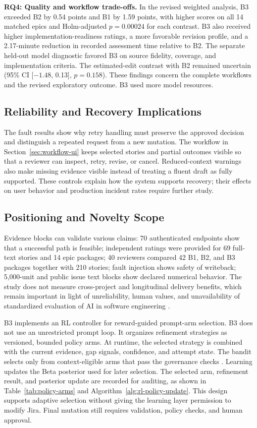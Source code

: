 \documentclass[pdflatex,sn-basic]{sn-jnl}
\begin{document}
\textbf{RQ4: Quality and workflow trade-offs.} In the revised weighted analysis, B3 exceeded B2 by 0.54 points and B1 by 1.59 points, with higher scores on all 14 matched epics and Holm-adjusted $p=0.00024$ for each contrast. B3 also received higher implementation-readiness ratings, a more favorable revision profile, and a 2.17-minute reduction in recorded assessment time relative to B2. The separate held-out model diagnostic favored B3 on source fidelity, coverage, and implementation criteria. The estimated-edit contrast with B2 remained uncertain (95\% CI [$-1.48$, 0.13], $p=0.158$). These findings concern the complete workflows and the revised exploratory outcome. B3 used more model resources.

\subsection{Reliability and Recovery Implications}
The fault results show why retry handling must preserve the approved decision and distinguish a repeated request from a new mutation. The workflow in Section~\ref{sec:workflow-ui} keeps selected stories and partial outcomes visible so that a reviewer can inspect, retry, revise, or cancel. Reduced-context warnings also make missing evidence visible instead of treating a fluent draft as fully supported. These controls explain how the system supports recovery; their effects on user behavior and production incident rates require further study.

\subsection{Positioning and Novelty Scope}

Evidence blocks can validate various claims: 70 authenticated endpoints show that a successful path is feasible; independent ratings were provided for 69 full-text stories and 14 epic packages; 40 reviewers compared 42 B1, B2, and B3 packages together with 210 stories; fault injection shows safety of writeback; 5{,}000-unit and public issue text blocks show declared numerical behavior. The study does not measure cross-project and longitudinal delivery benefits, which remain important in light of unreliability, human values, and unavailability of standardized evaluation of AI in software engineering \citep{R59,R81,R60}.

B3 implements an RL controller for reward-guided prompt-arm selection. B3 does not use an unrestricted prompt loop. It organizes refinement strategies as versioned, bounded policy arms. At runtime, the selected strategy is combined with the current evidence, gap signals, confidence, and attempt state. The bandit selects only from context-eligible arms that pass the governance checks \citep{R84,R86}. Learning updates the Beta posterior used for later selection. The selected arm, refinement result, and posterior update are recorded for auditing, as shown in Table~\ref{tab:policy-arms} and Algorithm~\ref{alg:rl-policy-update}. This design supports adaptive selection without giving the learning layer permission to modify Jira. Final mutation still requires validation, policy checks, and human approval.
\end{document}
